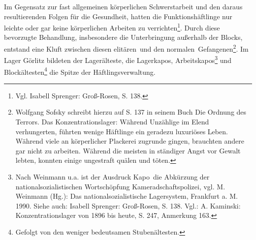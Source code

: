 Im Gegensatz zur fast allgemeinen körperlichen Schwerstarbeit und den daraus resultierenden Folgen für die Gesundheit, hatten die Funktionshäftlinge nur leichte oder gar keine körperlichen Arbeiten zu verrichten\footnote{Vgl. Isabell Sprenger: Groß-Rosen, S. 138.}. Durch diese bevorzugte Behandlung, insbesondere die Unterbringung außerhalb der Blocks, entstand eine Kluft zwischen diesen \glqq elitären\grqq~und den \glqq normalen\grqq~Gefangenen\footnote{Wolfgang Sofsky schreibt hierzu auf S. 137 in seinem Buch \glqq Die Ordnung des Terrors. Das Konzentrationslager\grqq: Während Unzählige im Elend verhungerten, führten wenige Häftlinge ein geradezu luxuriöses Leben. Während viele an körperlicher Plackerei zugrunde gingen, brauchten andere gar nicht zu arbeiten. Während die meisten in ständiger Angst vor Gewalt lebten, konnten einige ungestraft quälen und töten.}.\newline
Im Lager Görlitz bildeten der Lagerälteste, die Lagerkapos, Arbeitskapos\footnote{Nach Weinmann u.a. ist der Ausdruck \glqq Kapo\grqq~die Abkürzung der nationalsozialistischen Wortschöpfung \glqq Kameradschaftspolizei\grqq, vgl. M. Weinmann (Hg.): Das nationalsozialistische Lagersystem, Frankfurt a. M. 1990. Siehe auch: Isabell Sprenger: Groß-Rosen, S. 138. Vgl.: A. Kaminski: Konzentrationslager von 1896 bis heute, S. 247, Anmerkung 163.} und Blockältesten\footnote{Gefolgt von den weniger bedeutsamen Stubenältesten.} die Spitze der Häftlingsverwaltung.

